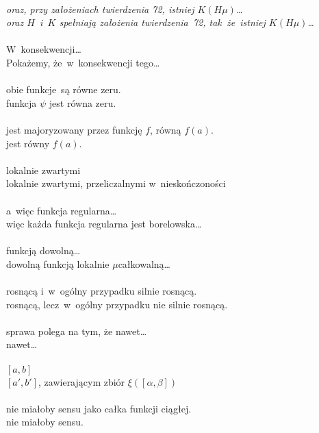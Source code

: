 \documentclass[a4paper,11pt]{article}
\begin{document}
 \\
\Jest \emph{oraz, przy założeniach twierdzenia 72, istniej
  $K( H \mu )$\ldots} \\
\Powin \emph{oraz $H$~i~$K$ spełniają założenia twierdzenia~72,
  tak~że~istniej $K( H \mu )$\ldots}\\
 \\
\Jest W~konsekwencji\ldots \\
\Powin  Pokażemy, że~w~konsekwencji tego\ldots \\
 \\
\Jest obie funkcje~są równe zeru. \\
\Powin  funkcja $\psi$ jest równa zeru. \\
 \\
\Jest jest majoryzowany przez funkcję $f$, równą $f( a )$. \\
\Powin  jest równy $f( a )$.\\
 \\
\Jest lokalnie zwartymi \\
\Powin  lokalnie zwartymi, przeliczalnymi w~nieskończoności \\
 \\
\Jest a~więc funkcja regularna\ldots \\
\Powin  więc każda funkcja regularna jest borelowska\ldots \\
 \\
\Jest funkcją dowolną\ldots \\
\Powin  dowolną funkcją lokalnie $\mu$\dywiz całkowalną\ldots \\
 \\
\Jest rosnącą i~w~ogólny przypadku silnie rosnącą. \\
\Powin  rosnącą, lecz~w~ogólny przypadku nie silnie rosnącą. \\
 \\
\Jest sprawa polega na tym, że nawet\ldots \\
\Powin  nawet\ldots \\
 \\
\Jest $[ a, b ]$ \\
\Powin  $[ a', b' ]$, zawierającym zbiór $\xi( [ \alpha, \beta ] )$ \\
 \\
\Jest nie miałoby sensu jako całka funkcji ciągłej. \\
\Powin  nie miałoby sensu. \\
\end{document}
